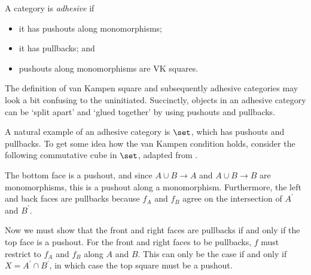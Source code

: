 \begin{definition}
    A category is \emph{adhesive} if
    \begin{itemize}
        \item it has pushouts along monomorphisms;
        \item it has pullbacks; and
        \item pushouts along monomorphisms are VK squares.
    \end{itemize}
\end{definition}

The definition of van Kampen square and subsequently adhesive categories may
look a bit confusing to the uninitiated.
Succinctly, objects in an adhesive category can
be `split apart' and `glued together' by using pushouts and pullbacks.

\begin{example}
    A natural example of an adhesive category is \(\set\), which has pushouts
    and pullbacks.
    To get some idea how the van Kampen condition holds, consider the
    following commutative cube in \(\set\), adapted from
    \cite[Sec.\ 4.3]{kissinger2012pictures}.
    \begin{center}
    \end{center}
    The bottom face is a pushout, and since \(A \cup B \to A\) and
    \(A \cup B \to B\) are monomorphisms, this is a pushout along a
    monomorphism.
    Furthermore, the left and back faces are pullbacks because \(f_A\) and
    \(f_B\) agree on the intersection of \(A^\prime\) and \(B^\prime\).

    Now we must show that the front and right faces are pullbacks if and only if
    the top face is a pushout.
    For the front and right faces to be pullbacks, \(f\) must restrict to
    \(f_A\) and \(f_B\) along \(A\) and \(B\).
    This can only be the case if and only if \(X = A^\prime \cap B^\prime\), in
    which case the top square must be a pushout.
\end{example}

